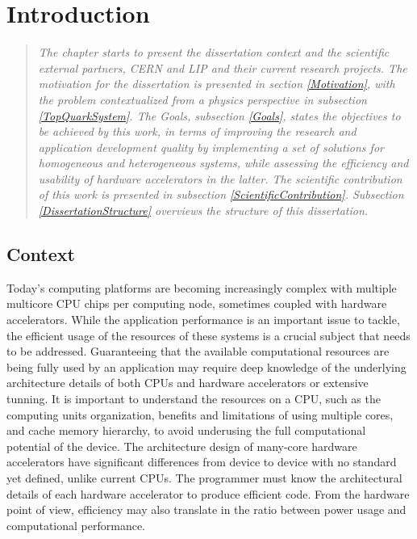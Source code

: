 \chapter{Introduction}
\label{Introduction}

\begin{quote}
\textit{The chapter starts to present the dissertation context and the scientific external partners, CERN and LIP and their current research projects. The motivation for the dissertation is presented in section \ref{Motivation}, with the problem contextualized from a physics perspective in subsection \ref{TopQuarkSystem}. The Goals, subsection \ref{Goals}, states the objectives to be achieved by this work, in terms of improving the research and application development quality by implementing a set of solutions for homogeneous and heterogeneous systems, while assessing the efficiency and usability of hardware accelerators in the latter. The scientific contribution of this work is presented in subsection \ref{ScientificContribution}. Subsection \ref{DissertationStructure} overviews the structure of this dissertation.}
\end{quote}

\section{Context}
\label{Context}

Today's computing platforms are becoming increasingly complex with multiple multicore CPU chips per computing node, sometimes coupled with hardware accelerators. While the application performance is an important issue to tackle, the efficient usage of the resources of these systems is a crucial subject that needs to be addressed. Guaranteeing that the available computational resources are being fully used by an application may require deep knowledge of the underlying architecture details of both CPUs and hardware accelerators or extensive tunning. It is important to understand the resources on a CPU, such as the computing units organization, benefits and limitations of using multiple cores, and cache memory hierarchy, to avoid underusing the full computational potential of the device. The architecture design of many-core hardware accelerators have significant differences from device to device with no standard yet defined, unlike current CPUs. The programmer must know the architectural details of each hardware accelerator to produce efficient code. From the hardware point of view, efficiency may also translate in the ratio between power usage and computational performance.

